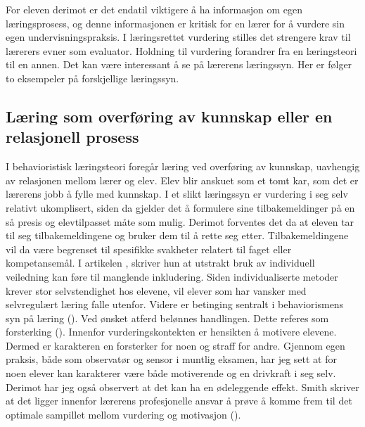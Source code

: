 \documentclass[main.tex]{subfiles}
\begin{document}
For eleven derimot er det endatil viktigere å ha informasjon om egen læringsprosess, og denne informasjonen er kritisk 
for en lærer for å vurdere sin egen undervisningspraksis. I læringsrettet vurdering stilles det strengere krav til 
lærerers evner som evaluator. Holdning til vurdering forandrer fra en læringsteori til en annen. Det kan være 
interessant å se på lærerens læringssyn. Her er følger to eksempeler på forskjellige læringssyn.

\subsection*{Læring som overføring av kunnskap eller en relasjonell prosess}

I behavioristisk læringsteori foregår læring ved overføring av kunnskap, uavhengig av relasjonen mellom lærer 
og elev. Elev blir anskuet som et tomt kar, som det er lærerens jobb å fylle med kunnskap. 
I et slikt læringssyn er vurdering i seg selv relativt ukomplisert, siden da gjelder det å 
formulere sine tilbakemeldinger på en så presis og elevtilpasset måte som mulig.
Derimot forventes det da at eleven tar til seg tilbakemeldingene og bruker dem til å rette seg etter.
Tilbakemeldingene vil da være begrenset til spesifikke svakheter relatert til faget eller kompetansemål.
I artikelen , skriver hun at utstrakt bruk av individuell veiledning kan føre
til manglende inkludering. Siden individualiserte metoder krever stor selvstendighet hos elevene, vil
elever som har vansker med selvregulært læring falle utenfor. Videre er betinging sentralt i behaviorismens 
syn på læring (). Ved ønsket atferd belønnes handlingen. Dette referes som forsterking 
(). Innenfor vurderingskontekten er hensikten å motivere elevene. Dermed er karakteren en 
forsterker for noen og straff for andre. Gjennom egen praksis, både som observatør og sensor i muntlig eksamen,
har jeg sett at for noen elever kan karakterer være både motiverende og en drivkraft i seg selv. Derimot
har jeg også observert at det kan ha en ødeleggende effekt. Smith skriver at det ligger innenfor
lærerens profesjonelle ansvar å prøve å komme frem til det optimale sampillet mellom vurdering og 
motivasjon ().
\end{document}
